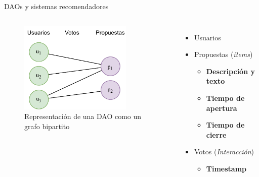 \begin{frame}{DAOs y sistemas recomendadores}
    \begin{columns}
        \begin{figure}
            \centering
            \includegraphics[height=44mm]{images/diagrams/dao-as-a-graph.drawio.pdf}
            \caption{Representación de una DAO como un grafo bipartito}
        \end{figure}
        \begin{itemize}
            \item Usuarios
            \item Propuestas (\textit{ítems})
            \begin{itemize}
                \item \textbf{Descripción y texto}
                \item \textbf{Tiempo de apertura}
                \item \textbf{Tiempo de cierre}
            \end{itemize}
            \item Votos (\textit{Interacción})
            \begin{itemize}
                \item \textbf{Timestamp}
            \end{itemize}
        \end{itemize}
    \end{columns}

\end{frame}
